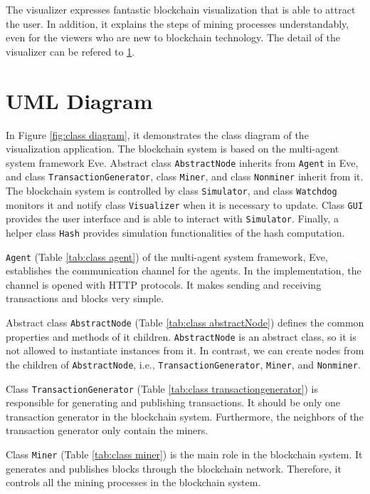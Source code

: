 The visualizer expresses fantastic blockchain visualization that is able to attract the user. In addition, it explains the steps of mining processes understandably, even for the viewers who are new to blockchain technology. The detail of the visualizer can be refered to \ref{}.

\section{UML Diagram}

In Figure \ref{fig:class diagram}, it demonstrates the class diagram of the visualization application. The blockchain system is based on the multi-agent system framework Eve. Abstract class \texttt{AbstractNode} inherits from \texttt{Agent} in Eve, and class \texttt{TransactionGenerator}, class \texttt{Miner}, and class \texttt{Nonminer} inherit from it. The blockchain system is controlled by class \texttt{Simulator}, and class \texttt{Watchdog} monitors it and notify class \texttt{Visualizer} when it is necessary to update. Class \texttt{GUI} provides the user interface and is able to interact with \texttt{Simulator}. Finally, a helper class \texttt{Hash} provides simulation functionalities of the hash computation.

\texttt{Agent} (Table \ref{tab:class agent}) of the multi-agent system framework, Eve, establishes the communication channel for the agents. In the implementation, the channel is opened with HTTP protocols. It makes sending and receiving transactions and blocks very simple. 

Abstract class \texttt{AbstractNode} (Table \ref{tab:class abstractNode}) defines the common properties and methods of it children. \texttt{AbstractNode} is an abstract class, so it is not allowed to instantiate instances from it. In contrast, we can create nodes from the children of \texttt{AbstractNode}, i.e., \texttt{TransactionGenerator}, \texttt{Miner}, and \texttt{Nonminer}. 

Class \texttt{TransactionGenerator} (Table \ref{tab:class transactiongenerator}) is responsible for generating and publishing transactions. It should be only one transaction generator in the blockchain system. Furthermore, the neighbors of the transaction generator only contain the miners.

Class \texttt{Miner} (Table \ref{tab:class miner}) is the main role in the blockchain system. It generates and publishes blocks through the blockchain network. Therefore, it controls all the mining processes in the blockchain system.


